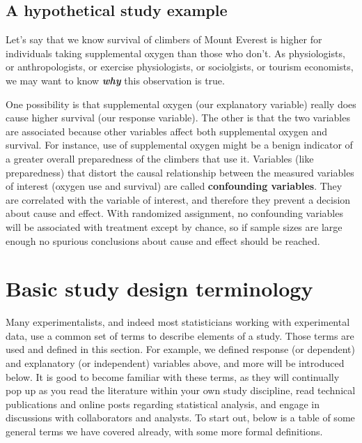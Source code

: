 \documentclass[]{book}
\begin{document}
\hypertarget{a-hypothetical-study-example}{%
\subsection{A hypothetical study example}\label{a-hypothetical-study-example}}

Let's say that we know survival of climbers of Mount Everest is higher for individuals taking supplemental oxygen than those who don't. As physiologists, or anthropologists, or exercise physiologists, or sociolgists, or tourism economists, we may want to know \textbf{\emph{why}} this observation is true.

One possibility is that supplemental oxygen (our explanatory variable) really does cause higher survival (our response variable). The other is that the two variables are associated because other variables affect both supplemental oxygen and survival. For instance, use of supplemental oxygen might be a benign indicator of a greater overall preparedness of the climbers that use it. Variables (like preparedness) that distort the causal relationship between the measured variables of interest (oxygen use and survival) are called \textbf{confounding variables}. They are correlated with the variable of interest, and therefore they prevent a decision about cause and effect. With randomized assignment, no confounding variables will be associated with treatment except by chance, so if sample sizes are large enough no spurious conclusions about cause and effect should be reached.

\hypertarget{basic-study-design-terminology}{%
\section{Basic study design terminology}\label{basic-study-design-terminology}}

Many experimentalists, and indeed most statisticians working with experimental data, use a common set of terms to describe elements of a study. Those terms are used and defined in this section. For example, we defined response (or dependent) and explanatory (or independent) variables above, and more will be introduced below. It is good to become familiar with these terms, as they will continually pop up as you read the literature within your own study discipline, read technical publications and online posts regarding statistical analysis, and engage in discussions with collaborators and analysts. To start out, below is a table of some general terms we have covered already, with some more formal definitions.
\end{document}
